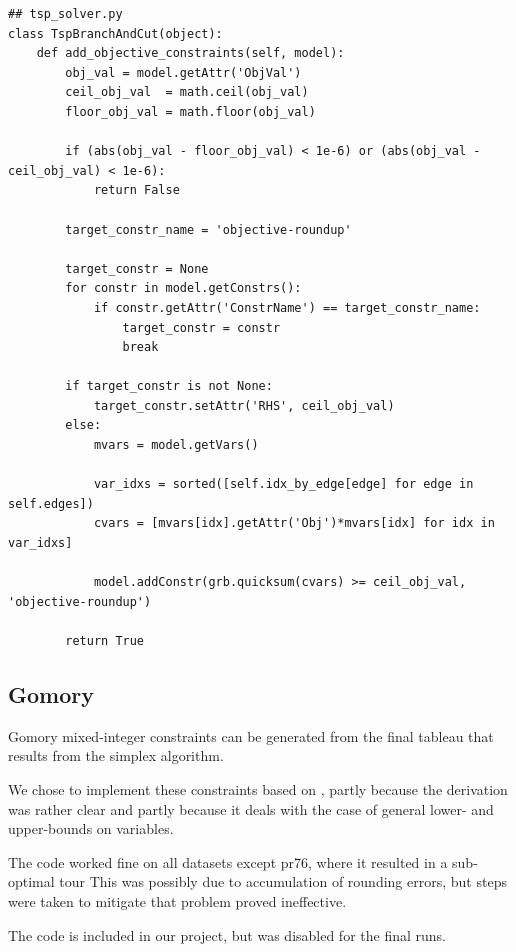 \documentclass{article}
\begin{document}
\begin{flushleft}
\begin{lstlisting}
## tsp_solver.py
class TspBranchAndCut(object):
    def add_objective_constraints(self, model):
        obj_val = model.getAttr('ObjVal')
        ceil_obj_val  = math.ceil(obj_val)
        floor_obj_val = math.floor(obj_val)

        if (abs(obj_val - floor_obj_val) < 1e-6) or (abs(obj_val - ceil_obj_val) < 1e-6):
            return False

        target_constr_name = 'objective-roundup'

        target_constr = None
        for constr in model.getConstrs():
            if constr.getAttr('ConstrName') == target_constr_name:
                target_constr = constr
                break

        if target_constr is not None:
            target_constr.setAttr('RHS', ceil_obj_val)
        else:
            mvars = model.getVars()

            var_idxs = sorted([self.idx_by_edge[edge] for edge in self.edges])
            cvars = [mvars[idx].getAttr('Obj')*mvars[idx] for idx in var_idxs]

            model.addConstr(grb.quicksum(cvars) >= ceil_obj_val, 'objective-roundup')

        return True
\end{lstlisting}

\subsection{Gomory}
\begin{flushleft}

Gomory mixed-integer constraints
can be generated from the final tableau
that results from the simplex algorithm.

We chose to implement these constraints
based on \cite{gomory},
partly because the derivation was rather clear
and partly because it deals with the case
of general lower- and upper-bounds on variables.

The code worked fine on all datasets except pr76,
where it resulted in a sub-optimal tour
This was possibly due to accumulation of rounding errors,
but steps were taken to mitigate that problem proved ineffective.

The code is included in our project,
but was disabled for the final runs.

\end{flushleft}

\end{flushleft}
\end{document}
